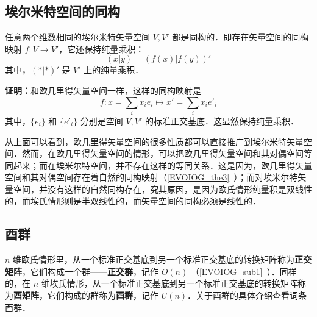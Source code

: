 \subsection{埃尔米特空间的同构}
\begin{theorem}{}
任意两个维数相同的埃尔米特矢量空间 $V,V'$ 都是同构的．即存在矢量空间的同构映射 $f:V\rightarrow V'$，它还保持纯量乘积：
\begin{equation}
(  x|  y)=(f(  x)|f(  y))'
\end{equation}
其中，$(*|*)'$ 是 $V'$ 上的纯量乘积．
\end{theorem}
\textbf{证明：}和欧几里得矢量空间一样，这样的同构映射是
\begin{equation}
f:  x=\sum_{i}x_i  e_i\mapsto  x'=\sum_i x_i  e'_i
\end{equation}
其中，$\{  e_i\}$ 和 $\{  e'_i\}$ 分别是空间 $V,V'$ 的标准正交基底．这显然保持纯量乘积．

从上面可以看到，欧几里得矢量空间的很多性质都可以直接推广到埃尔米特矢量空间．然而，在欧几里得矢量空间的情形，可以把欧几里得矢量空间和其对偶空间等同起来；而在埃米尔特空间，并不存在这样的等同关系．这是因为，欧几里得矢量空间和其对偶空间存在着自然的同构映射（\autoref{EVOIOG_the3}~）；而对埃米尔特矢量空间，并没有这样的自然同构存在，究其原因，是因为欧氏情形纯量积是双线性的，而埃氏情形则是半双线性的，而矢量空间的同构必须是线性的．
\subsection{酉群}
 $n$ 维欧氏情形里，从一个标准正交基底到另一个标准正交基底的转换矩阵称为\textbf{正交矩阵}，它们构成一个群——\textbf{正交群}，记作 $O(n)$ （\autoref{EVOIOG_sub1}~）．同样的，在 $n$ 维埃氏情形，从一个标准正交基底到另一个标准正交基底的转换矩阵称为\textbf{酉矩阵}，它们构成的群称为\textbf{酉群}，记作 $U(n)$．关于酉群的具体介绍查看词条酉群．
